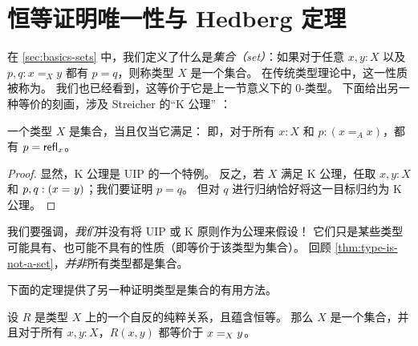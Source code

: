 \section{恒等证明唯一性与 Hedberg 定理}
\label{sec:hedberg}

%

在 \cref{sec:basics-sets} 中，我们定义了什么是\emph{集合（set）}：如果对于任意 $x, y : X$ 以及 $p, q : x =_X y$ 都有 $p = q$，则称类型 $X$ 是一个集合。
在传统类型理论中，这一性质被称为。
%
我们也已经看到，这等价于它是上一节意义下的 $0$-类型。
下面给出另一种等价的刻画，涉及 Streicher 的``K 公理'' \cite{Streicher93}：

\begin{thm}\label{thm:h-set-uip-K}
 一个类型 $X$ 是集合，当且仅当它满足：
 即，对于所有 $x : X$ 和 $p : (x =_A x)$，都有 $p = \refl{x}$。
\end{thm}

\begin{proof}
 显然，K 公理是 UIP 的一个特例。
 反之，若 $X$ 满足 K 公理，任取 $x, y : X$ 和 $p, q : (\id{x}{y})$；我们要证明 $p=q$。
 但对 $q$ 进行归纳恰好将这一目标归约为 K 公理。
\end{proof}

我们要强调，\emph{我们}并没有将 UIP 或 K 原则作为公理来假设！
它们只是某些类型可能具有、也可能不具有的性质（即等价于该类型为集合）。
回顾 \cref{thm:type-is-not-a-set}，\emph{并非}所有类型都是集合。

下面的定理提供了另一种证明类型是集合的有用方法。

\begin{thm}\label{thm:h-set-refrel-in-paths-sets}
  设 $R$ 是类型 $X$ 上的一个自反的纯粹关系，且蕴含恒等。
  那么 $X$ 是一个集合，并且对于所有 $x,y:X$，$R(x,y)$ 都等价于 $\id[X]{x}{y}$。
\end{thm}

